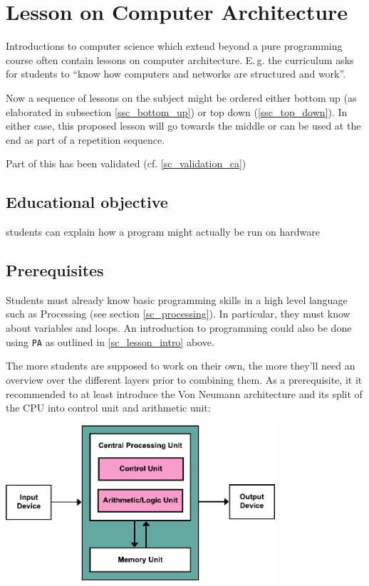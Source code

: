 \section{Lesson on Computer Architecture} \label{sc_lesson_ca}
Introductions to computer science which extend beyond a pure programming course often contain lessons on computer architecture. E.\,g. the curriculum \cite[p.\,145]{Erz16} asks for students to ``know how computers and networks are structured and work''.

Now a sequence of lessons on the subject might be ordered either bottom up (as elaborated in subsection \ref{ssc_bottom_up}) or top down (\ref{ssc_top_down}). In either case, this proposed lesson will go towards the middle or can be used at the end as part of a repetition sequence.

Part of this has been validated (cf. \ref{sc_validation_ca})

\subsection{Educational objective}

\begin{todo}
\item students can explain how a program might actually be run on hardware
\end{todo}


\subsection{Prerequisites}
Students must already know basic programming skills in a high level language such as Processing (see section \ref{sc_processing}). In particular, they must know about variables and loops. An introduction to programming could also be done using \texttt{PA} as outlined in \ref{sc_lesson_intro} above.

The more students are supposed to work on their own, the more they'll need an overview over the different layers prior to combining them. As a prerequisite, it it recommended to at least introduce the Von Neumann architecture and its split of the CPU into control unit and arithmetic unit:

\begin{center}
\includegraphics[width=10cm]{images/Von_Neumann_Architecture.pdf}
\\ 
\end{center}

